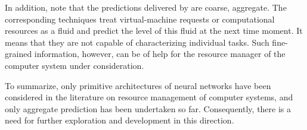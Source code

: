 In addition, note that the predictions delivered by \cite{cao2014, dabbagh2015,
ismaeel2015} are coarse, aggregate. The corresponding techniques treat
virtual-machine requests or computational resources as a fluid and predict the
level of this fluid at the next time moment. It means that they are not capable
of characterizing individual tasks. Such fine-grained information, however, can
be of help for the resource manager of the computer system under consideration.

To summarize, only primitive architectures of neural networks have been
considered in the literature on resource management of computer systems, and
only aggregate prediction has been undertaken so far. Consequently, there is a
need for further exploration and development in this direction.
